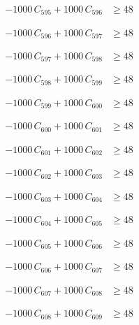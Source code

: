 \documentclass[a4paper,11pt]{article}
\begin{document}
\begin{align}
-1000\,C_{595} + 1000\,C_{596} &\geq 48 \nonumber
\end{align}

\begin{align}
-1000\,C_{596} + 1000\,C_{597} &\geq 48 \nonumber
\end{align}

\begin{align}
-1000\,C_{597} + 1000\,C_{598} &\geq 48 \nonumber
\end{align}

\begin{align}
-1000\,C_{598} + 1000\,C_{599} &\geq 48 \nonumber
\end{align}

\begin{align}
-1000\,C_{599} + 1000\,C_{600} &\geq 48 \nonumber
\end{align}

\begin{align}
-1000\,C_{600} + 1000\,C_{601} &\geq 48 \nonumber
\end{align}

\begin{align}
-1000\,C_{601} + 1000\,C_{602} &\geq 48 \nonumber
\end{align}

\begin{align}
-1000\,C_{602} + 1000\,C_{603} &\geq 48 \nonumber
\end{align}

\begin{align}
-1000\,C_{603} + 1000\,C_{604} &\geq 48 \nonumber
\end{align}

\begin{align}
-1000\,C_{604} + 1000\,C_{605} &\geq 48 \nonumber
\end{align}

\begin{align}
-1000\,C_{605} + 1000\,C_{606} &\geq 48 \nonumber
\end{align}

\begin{align}
-1000\,C_{606} + 1000\,C_{607} &\geq 48 \nonumber
\end{align}

\begin{align}
-1000\,C_{607} + 1000\,C_{608} &\geq 48 \nonumber
\end{align}

\begin{align}
-1000\,C_{608} + 1000\,C_{609} &\geq 48 \nonumber
\end{align}
\end{document}

